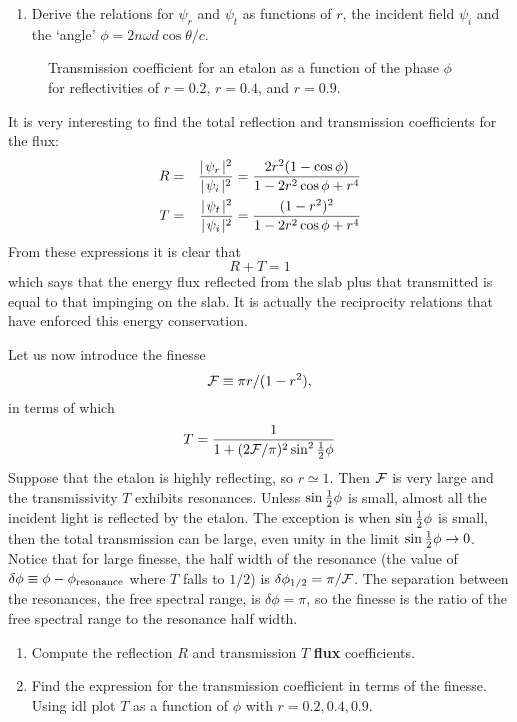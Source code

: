 \documentclass{article}
\newcommand{\bea}[1]{\begin{eqnarray}\label{#1}}
\newcommand{\eea}{\end{eqnarray}}
\def\cl#1{{\cal #1}}               %
\def\labs{\mid\!}
\def\rabs{\!\mid}
\begin{document}
\begin{enumerate}
\setcounter{enumi}{\value{count}}
\item Derive the relations for $\psi_r$ and $\psi_t$ as functions of
  $r$, the incident field $\psi_i$ and the `angle' $\phi={2n\omega
    d\cos\theta/c}$. 
\setcounter{count}{\value{enumi}}
\end{enumerate}

\begin{figure}[h]
  \centering  {}
  \caption{Transmission coefficient for an etalon as a function of the phase $\phi$ for 
reflectivities of $r=0.2$, $r=0.4$, and $r=0.9$.}
  \label{fig:fabry-transmission}
\end{figure}

It is very interesting to find the total reflection and transmission coefficients for the flux:
\bea{eq:reflection-transmission}
R&=&{\labs\psi_r\rabs^2\over\labs\psi_i\rabs^2}={2r^2(1-\cos\phi)\over 1-2r^2\cos\phi+r^4}\nonumber \\
T&=&{\labs\psi_t\rabs^2\over\labs\psi_i\rabs^2}={(1-r^2)^2\over 
 1-2r^2\cos\phi+r^4}
\eea
\noindent
From these expressions it is clear that
\[ R+T=1 \]
\noindent
which says that the energy flux reflected from the slab plus that transmitted is equal to that impinging on the slab. It is actually the reciprocity relations that have enforced this energy conservation.

Let us now introduce the finesse 
\[\cl{F}\equiv {\pi r/(1-r^2)}, \]
in terms of which
\[ T={1\over 1+({2\cl{F}/\pi})^2\sin^2{1\over 2}\phi} \]
\noindent
Suppose that the etalon is highly reflecting, so $r\simeq 1$. Then $\cl{F}$ is very large
and the transmissivity $T$ exhibits resonances. Unless $\sin{1\over 2}\phi$ is small, 
almost all the incident light is reflected by the etalon. The exception is when $\sin{1\over 2}\phi$ is small, then the total transmission can be large, even unity in the limit $\sin{1\over 2}\phi\rightarrow 0$. Notice that for large finesse, the half width of the resonance (the value of $\delta\phi\equiv\phi-\phi_{\rm resonance}$  where $T$ falls to $1/2$) is $\delta\phi_{1/2}={\pi/\cl{F}}$. The separation between the resonances, the
free spectral range, is $\delta\phi=\pi$, so the finesse is the ratio of the free spectral 
range to the resonance half width.

\begin{enumerate}
\setcounter{enumi}{\value{count}}
\item Compute the reflection $R$ and transmission $T$ {\bf flux}
  coefficients. 
\item Find the expression for the transmission coefficient in terms of
  the finesse. Using {\sc idl} plot $T$ as a function of $\phi$ with $r=0.2,0.4,0.9$.
\setcounter{count}{\value{enumi}}
\end{enumerate}
\end{document}
